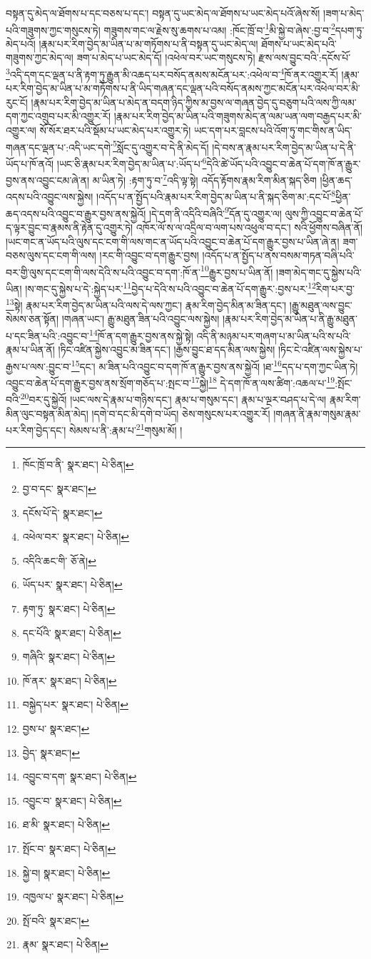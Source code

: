 བསྟན་དུ་མེད་ལ་ཐོགས་པ་དང་བཅས་པ་དང་། བསྟན་དུ་ཡང་མེད་ལ་ཐོགས་པ་ཡང་མེད་པའོ་ཞེས་སོ། །ཟག་པ་མེད་པའི་གཟུགས་ཀྱང་གསུངས་ཏེ། གཟུགས་གང་ལ་རྗེས་སུ་ཆགས་པ་འམ། :ཁོང་ཁྲོ་བ་\footnote{ཁོང་ཁྲོ་བ་ནི་  སྣར་ཐང་།  པེ་ཅིན། }མི་སྐྱེ་བ་ཞེས་:བྱ་བ་\footnote{བྱ་བ་དང་  སྣར་ཐང་། }དཔག་ཏུ་མེད་པའོ། །རྣམ་པར་རིག་བྱེད་མ་ཡིན་པ་མ་གཏོགས་པ་ནི་བསྟན་དུ་ཡང་མེད་ལ། ཐོགས་པ་ཡང་མེད་པའི་གཟུགས་ཀྱང་མེད་ལ། ཟག་པ་མེད་པ་ཡང་མེད་དོ། །འཕེལ་བར་ཡང་གསུངས་ཏེ། རྫས་ལས་བྱུང་བའི་:དངོས་པོ་\footnote{དངོས་པོ་དེ་  སྣར་ཐང་། }འདི་དག་དང་ལྡན་པ་ནི་རྟག་ཏུ་རྒྱུན་མི་འཆད་པར་བསོད་ནམས་མངོན་པར་:འཕེལ་བ་\footnote{འཕེལ་བར་  སྣར་ཐང་།  པེ་ཅིན། }ཁོ་ནར་འགྱུར་རོ། །རྣམ་པར་རིག་བྱེད་མ་ཡིན་པ་མ་གཏོགས་པ་ནི་ཡིད་གཞན་དང་ལྡན་པའི་བསོད་ནམས་ཀྱང་མངོན་པར་འཕེལ་བར་མི་རུང་ངོ། །རྣམ་པར་རིག་བྱེད་མ་ཡིན་པ་མེད་ན་བདག་ཉིད་ཀྱིས་མ་བྱས་ལ་གཞན་བྱེད་དུ་བཅུག་པའི་ལས་ཀྱི་ལམ་དག་ཀྱང་འགྲུབ་པར་མི་འགྱུར་རོ། །རྣམ་པར་རིག་བྱེད་མ་ཡིན་པའི་གཟུགས་མེད་ན་ལམ་ཡན་ལག་བརྒྱད་པར་མི་འགྱུར་ལ། སོ་སོར་ཐར་པའི་སྡོམ་པ་ཡང་མེད་པར་འགྱུར་ཏེ། ཡང་དག་པར་བླངས་པའི་འོག་ཏུ་གང་གིས་ན་ཡིད་གཞན་དང་ལྡན་པ་:འདི་ཡང་དགེ་\footnote{འདིའི་ཆང་གི་  ཅོ་ནེ། }སློང་དུ་འགྱུར་བ་དེ་ནི་མེད་དོ། །དེ་བས་ན་རྣམ་པར་རིག་བྱེད་མ་ཡིན་པ་དེ་ནི་ཡོད་པ་ཁོ་ནའོ། །ཡང་ཅི་རྣམ་པར་རིག་བྱེད་མ་ཡིན་པ་:ཡོད་པ་\footnote{ཡོད་པར་  སྣར་ཐང་།  པེ་ཅིན། }དེའི་ཚེ་ཡོད་པའི་འབྱུང་བ་ཆེན་པོ་དག་ཁོ་ན་རྒྱུར་བྱས་ནས་འབྱུང་ངམ་ཞེ་ན། མ་ཡིན་ཏེ། :རྟག་ཏུ་བ་\footnote{རྟག་ཏུ་  སྣར་ཐང་།  པེ་ཅིན། }འདི་ལྟ་སྟེ། འདོད་རྟོགས་རྣམ་རིག་མིན་སྐད་ཅིག །ཕྱིན་ཆད་འདས་པའི་འབྱུང་ལས་སྐྱེས། །འདོད་པ་ན་སྤྱོད་པའི་རྣམ་པར་རིག་བྱེད་མ་ཡིན་པ་ནི་སྐད་ཅིག་མ་:དང་པོ་\footnote{དང་པོའི་  སྣར་ཐང་།  པེ་ཅིན། }ཕྱིན་ཆད་འདས་པའི་འབྱུང་བ་རྒྱུར་བྱས་ནས་སྐྱེའོ། །དེ་དག་ནི་འདིའི་བཞིའི་\footnote{གཞིའི་  སྣར་ཐང་།  པེ་ཅིན། }དོན་དུ་འགྱུར་ལ། ལུས་ཀྱི་འབྱུང་བ་ཆེན་པོ་ད་ལྟར་བྱུང་བ་རྣམས་ནི་རྟེན་དུ་འགྱུར་ཏེ། འཁོར་ལོ་ས་ལ་འདྲིལ་བ་ལག་པས་འཕུལ་བ་དང་། སའི་ཕྱོགས་བཞིན་ནོ། །ཡང་གང་ན་ཡོད་པའི་ལུས་དང་ངག་གི་ལས་གང་ན་ཡོད་པའི་འབྱུང་བ་ཆེན་པོ་དག་རྒྱུར་བྱས་པ་ཡིན་ཞེ་ན། ཟག་བཅས་ལུས་དང་ངག་གི་ལས། །རང་གི་འབྱུང་བ་དག་རྒྱུར་བྱས། །འདོད་པ་ན་སྤྱོད་པ་ནས་བསམ་གཏན་བཞི་པའི་བར་གྱི་ལུས་དང་ངག་གི་ལས་དེའི་ས་པའི་འབྱུང་བ་དག་:ཁོ་ན་\footnote{ཁོ་ནར་  སྣར་ཐང་།  པེ་ཅིན། }རྒྱུར་བྱས་པ་ཡིན་ནོ། །ཟག་མེད་གང་དུ་སྐྱེས་པའི་ཡིན། །ས་གང་དུ་སྐྱེས་པ་དེ་:སྐྱེད་པར་\footnote{བསྐྱེད་པར་  སྣར་ཐང་།  པེ་ཅིན། }བྱེད་པ་དེའི་ས་པའི་འབྱུང་བ་ཆེན་པོ་དག་རྒྱུར་:བྱས་པར་\footnote{བྱས་པ་  སྣར་ཐང་། }རིག་པར་བྱ་\footnote{བྱེད་  སྣར་ཐང་། }སྟེ། རྣམ་པར་རིག་བྱེད་མ་ཡིན་པའི་ལས་དེ་ལས་ཀྱང་། རྣམ་རིག་བྱེད་མིན་མ་ཟིན་དང་། །རྒྱུ་མཐུན་ལས་བྱུང་སེམས་ཅན་སྟོན། །གཞན་ཡང་། རྒྱུ་མཐུན་ཟིན་པའི་འབྱུང་ལས་སྐྱེས། །རྣམ་པར་རིག་བྱེད་མ་ཡིན་པ་ནི་རྒྱུ་མཐུན་པ་དང་ཟིན་པའི་:འབྱུང་བ་\footnote{འབྱུང་བ་དག་  སྣར་ཐང་།  པེ་ཅིན། }ཁོ་ན་དག་རྒྱུར་བྱས་ནས་སྐྱེ་སྟེ། འདི་ནི་མཉམ་པར་གཞག་པ་མ་ཡིན་པའི་ས་པའི་རྣམ་པ་ཡིན་ནོ། །ཏིང་འཛིན་སྐྱེས་འབྱུང་མ་ཟིན་དང་། །རྒྱས་བྱུང་ཐ་དད་མིན་ལས་སྐྱེས། །ཏིང་ངེ་འཛིན་ལས་སྐྱེས་པ་རྒྱས་པ་ལས་:བྱུང་བ་\footnote{འབྱུང་བ་  སྣར་ཐང་།  པེ་ཅིན། }དང་། མ་ཟིན་པའི་འབྱུང་བ་དག་ཁོ་ན་རྒྱུར་བྱས་ནས་སྐྱེའོ། །ཐ་\footnote{ཐ་མི་  སྣར་ཐང་།  པེ་ཅིན། }དད་པ་དག་ཀྱང་ཡིན་ཏེ། འབྱུང་བ་ཆེན་པོ་དག་རྒྱུར་བྱས་ནས་སྲོག་གཅོད་པ་:སྤང་བ་\footnote{སྤོང་བ་  སྣར་ཐང་།  པེ་ཅིན། }སྐྱེ།\footnote{སྐྱེ་བ།  སྣར་ཐང་།  པེ་ཅིན། } དེ་དག་ཁོ་ན་ལས་ཚིག་:འཆལ་པ་\footnote{འཁྱལ་པ་  སྣར་ཐང་།  པེ་ཅིན། }:སྤོང་བའི་\footnote{སྤོ་བའི་  སྣར་ཐང་། }བར་དུ་སྐྱེའོ། །ཡང་ལས་དེ་རྣམ་པ་གཉིས་དང་། རྣམ་པ་གསུམ་དང་། རྣམ་པ་ལྔར་བཤད་པ་དེ་ལ། རྣམ་རིག་མིན་ལུང་བསྟན་མིན་མེད། །དགེ་བ་དང་མི་དགེ་བ་ཡོད། ཅེས་གསུངས་པར་འགྱུར་རོ། །གཞན་ནི་རྣམ་གསུམ་རྣམ་པར་རིག་བྱེད་དང་། སེམས་པ་ནི་:རྣམ་པ་\footnote{རྣམ་  སྣར་ཐང་།  པེ་ཅིན། }གསུམ་མོ། །
